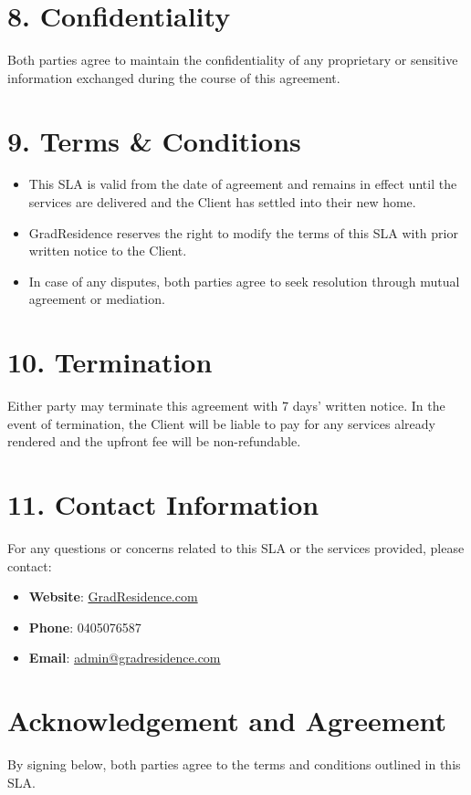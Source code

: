 \documentclass[a4paper,12pt]{article}
\begin{document}
\section*{8. Confidentiality}
Both parties agree to maintain the confidentiality of any proprietary or sensitive information exchanged during the course of this agreement.

\section*{9. Terms \& Conditions}
\begin{itemize}
    \item This SLA is valid from the date of agreement and remains in effect until the services are delivered and the Client has settled into their new home.
    \item GradResidence reserves the right to modify the terms of this SLA with prior written notice to the Client.
    \item In case of any disputes, both parties agree to seek resolution through mutual agreement or mediation.
\end{itemize}

\section*{10. Termination}
Either party may terminate this agreement with 7 days' written notice. In the event of termination, the Client will be liable to pay for any services already rendered and the upfront fee will be non-refundable.

\section*{11. Contact Information}
For any questions or concerns related to this SLA or the services provided, please contact:
\begin{itemize}
    \item \textbf{Website}: \href{http://www.gradresidence.com}{GradResidence.com}
    \item \textbf{Phone}: 0405076587
    \item \textbf{Email}: \href{mailto:admin@gradresidence.com}{admin@gradresidence.com}
\end{itemize}

\vspace{1cm}

\section*{Acknowledgement and Agreement}
By signing below, both parties agree to the terms and conditions outlined in this SLA.
\end{document}
